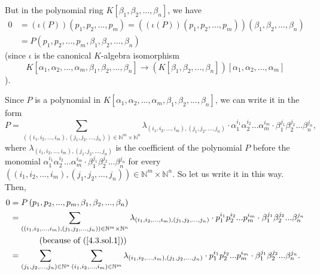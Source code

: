 \documentclass[numbers=enddot,12pt,final,onecolumn,notitlepage]{scrartcl}%
\begin{document}
But in the polynomial ring $K\left[  \beta_{1},\beta_{2},...,\beta_{n}\right]
$, we have%
\begin{align*}
0  &  =\left(  \iota\left(  P\right)  \right)  \left(  p_{1},p_{2}%
,...,p_{m}\right)  =\left(  \left(  \iota\left(  P\right)  \right)  \left(
p_{1},p_{2},...,p_{m}\right)  \right)  \left(  \beta_{1},\beta_{2}%
,...,\beta_{n}\right) \\
&  =P\left(  p_{1},p_{2},...,p_{m},\beta_{1},\beta_{2},...,\beta_{n}\right)
\end{align*}
(since $\iota$ is the canonical $K$-algebra isomorphism
\[
K\left[  \alpha_{1},\alpha_{2},...,\alpha_{m},\beta_{1},\beta_{2}%
,...,\beta_{n}\right]  \rightarrow\left(  K\left[  \beta_{1},\beta
_{2},...,\beta_{n}\right]  \right)  \left[  \alpha_{1},\alpha_{2}%
,...,\alpha_{m}\right]
\]
).

Since $P$ is a polynomial in $K\left[  \alpha_{1},\alpha_{2},...,\alpha
_{m},\beta_{1},\beta_{2},...,\beta_{n}\right]  $, we can write it in the form%
\begin{equation}
P=\sum\limits_{\left(  \left(  i_{1},i_{2},...,i_{m}\right)  ,\left(
j_{1},j_{2},...,j_{n}\right)  \right)  \in\mathbb{N}^{m}\times\mathbb{N}^{n}%
}\lambda_{\left(  i_{1},i_{2},...,i_{m}\right)  ,\left(  j_{1},j_{2}%
,...,j_{n}\right)  }\cdot\alpha_{1}^{i_{1}}\alpha_{2}^{i_{2}}...\alpha
_{m}^{i_{m}}\cdot\beta_{1}^{j_{1}}\beta_{2}^{j_{2}}...\beta_{n}^{j_{n}},
\label{4.3.sol.1}%
\end{equation}
where $\lambda_{\left(  i_{1},i_{2},...,i_{m}\right)  ,\left(  j_{1}%
,j_{2},...,j_{n}\right)  }$ is the coefficient of the polynomial $P$ before
the monomial $\alpha_{1}^{i_{1}}\alpha_{2}^{i_{2}}...\alpha_{m}^{i_{m}}%
\cdot\beta_{1}^{j_{1}}\beta_{2}^{j_{2}}...\beta_{n}^{j_{n}}$ for every
$\left(  \left(  i_{1},i_{2},...,i_{m}\right)  ,\left(  j_{1},j_{2}%
,...,j_{n}\right)  \right)  \in\mathbb{N}^{m}\times\mathbb{N}^{n}$. So let us
write it in this way. Then,%
\begin{align}
0  &  =P\left(  p_{1},p_{2},...,p_{m},\beta_{1},\beta_{2},...,\beta_{n}\right)
\nonumber\\
&  =\sum\limits_{\left(  \left(  i_{1},i_{2},...,i_{m}\right)  ,\left(
j_{1},j_{2},...,j_{n}\right)  \right)  \in\mathbb{N}^{m}\times\mathbb{N}^{n}%
}\lambda_{\left(  i_{1},i_{2},...,i_{m}\right)  ,\left(  j_{1},j_{2}%
,...,j_{n}\right)  }\cdot p_{1}^{i_{1}}p_{2}^{i_{2}}...p_{m}^{i_{m}}\cdot
\beta_{1}^{j_{1}}\beta_{2}^{j_{2}}...\beta_{n}^{j_{n}}\nonumber\\
&  \ \ \ \ \ \ \ \ \ \ \left(  \text{because of (\ref{4.3.sol.1})}\right)
\nonumber\\
&  =\sum\limits_{\left(  j_{1},j_{2},...,j_{n}\right)  \in\mathbb{N}^{n}}%
\sum\limits_{\left(  i_{1},i_{2},...,i_{m}\right)  \in\mathbb{N}^{m}}%
\lambda_{\left(  i_{1},i_{2},...,i_{m}\right)  ,\left(  j_{1},j_{2}%
,...,j_{n}\right)  }\cdot p_{1}^{i_{1}}p_{2}^{i_{2}}...p_{m}^{i_{m}}\cdot
\beta_{1}^{j_{1}}\beta_{2}^{j_{2}}...\beta_{n}^{j_{n}}. \label{4.3.sol.2}%
\end{align}
\end{document}
